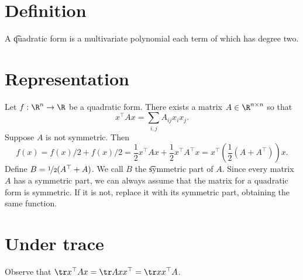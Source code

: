 
\section*{Definition}

A \t{quadratic form} is a multivariate polynomial each term of which has degree two.

\section*{Representation}

Let $f: \R ^n \to \R $ be a quadratic form.
There exists a matrix $A \in \R ^{n \times n}$ so that
  \[
x^\top  A x = \sum_{i,j} A_{ij}x_{i}x_{j}.
  \]
Suppose $A$ is not symmetric. Then
  \[
f(x) = f(x)/2 + f(x)/2 = \frac{1}{2}x^\top Ax + \frac{1}{2}x^\top A^\top x = x^\top (\frac{1}{2}(A + A^\top ))x.
  \]
Define $B = \nicefrac{1}{2}(A^\top  + A)$.
We call $B$ the \t{symmetric part} of $A$.
Since every matrix $A$ has a symmetric part, we can always assume that the matrix for a quadratic form is symmetric.
If it is not, replace it with its symmetric part, obtaining the same function.

\section*{Under trace}

Observe that $\tr x^\top  A x = \tr A x x^\top  = \tr xx^\top A$.

\blankpage